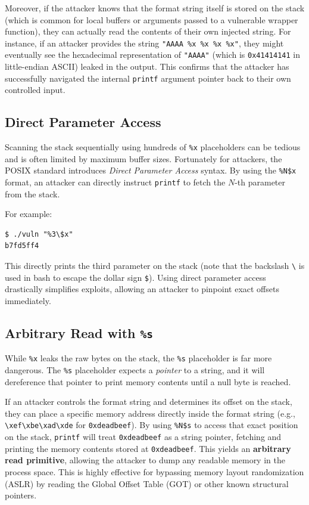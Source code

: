 Moreover, if the attacker knows that the format string itself is stored on the stack (which is common for local buffers or arguments passed to a vulnerable wrapper function), they can actually read the contents of their own injected string. For instance, if an attacker provides the string \texttt{"AAAA \%x \%x \%x \%x"}, they might eventually see the hexadecimal representation of \texttt{"AAAA"} (which is \texttt{0x41414141} in little-endian ASCII) leaked in the output. This confirms that the attacker has successfully navigated the internal \texttt{printf} argument pointer back to their own controlled input.

\subsection{Direct Parameter Access}
Scanning the stack sequentially using hundreds of \texttt{\%x} placeholders can be tedious and is often limited by maximum buffer sizes. Fortunately for attackers, the POSIX standard introduces \emph{Direct Parameter Access} syntax. By using the \texttt{\%N\$x} format, an attacker can directly instruct \texttt{printf} to fetch the $N$-th parameter from the stack.

For example:
\begin{verbatim}
$ ./vuln "%3\$x"
b7fd5ff4
\end{verbatim}
This directly prints the third parameter on the stack (note that the backslash \texttt{\textbackslash{}} is used in bash to escape the dollar sign \texttt{\$}). Using direct parameter access drastically simplifies exploits, allowing an attacker to pinpoint exact offsets immediately.

\subsection{Arbitrary Read with \texttt{\%s}}
While \texttt{\%x} leaks the raw bytes on the stack, the \texttt{\%s} placeholder is far more dangerous. The \texttt{\%s} placeholder expects a \emph{pointer} to a string, and it will dereference that pointer to print memory contents until a null byte is reached.

If an attacker controls the format string and determines its offset on the stack, they can place a specific memory address directly inside the format string (e.g., \texttt{\textbackslash{}xef\textbackslash{}xbe\textbackslash{}xad\textbackslash{}xde} for \texttt{0xdeadbeef}). By using \texttt{\%N\$s} to access that exact position on the stack, \texttt{printf} will treat \texttt{0xdeadbeef} as a string pointer, fetching and printing the memory contents stored at \texttt{0xdeadbeef}. This yields an \textbf{arbitrary read primitive}, allowing the attacker to dump any readable memory in the process space. This is highly effective for bypassing memory layout randomization (ASLR) by reading the Global Offset Table (GOT) or other known structural pointers.

